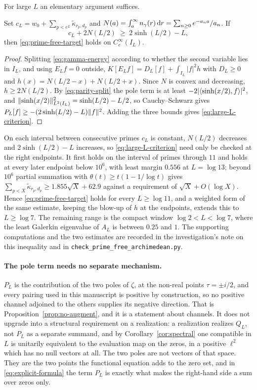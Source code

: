 For large $L$ an elementary argument suffices.

\begin{proposition}\label{prop:prime-free-large-L}
Set $c_L=w_0+\sum_{p<e^L}\widetilde\kappa_{r_p,d_p}$ and
$N(a)=\int_a^\infty n_{\gamma}(r)\,\mathrm d r=\sum_{n\geq0}e^{-a_na}/a_n$. If
\begin{equation}\label{eq:large-L-criterion}
 c_L+2N(L/2)\;\geq\;2\sinh(L/2)-L,
\end{equation}
then \eqref{eq:prime-free-target} holds on $C_c^\infty(I_L)$.
\end{proposition}
\begin{proof}
Splitting \eqref{eq:gamma-energy} according to whether the second variable lies
in $I_L$, and using $E_Lf=0$ outside,
$K[E_Lf]=D_L[f]+\int_{I_L}|f|^2h$ with $D_L\geq0$ and
$h(x)=N(L/2-x)+N(L/2+x)$. Since $N$ is convex and decreasing,
$h\geq2N(L/2)$. By \eqref{eq:parity-split} the pole term is at least
$-2|\langle \sinh(x/2),f\rangle|^2$, and
$\lVert \sinh(x/2)\rVert_{L^2(I_L)}^2=\sinh(L/2)-L/2$, so Cauchy--Schwarz gives
$P_L[f]\geq-(2\sinh(L/2)-L)\lVert f\rVert^2$. Adding the three bounds gives
\eqref{eq:large-L-criterion}.
\end{proof}

On each interval between consecutive primes $c_L$ is constant, $N(L/2)$
decreases and $2\sinh(L/2)-L$ increases, so \eqref{eq:large-L-criterion} need
only be checked at the right endpoints. It first holds on the interval of
primes through $11$ and holds at every later endpoint below $10^6$, with least
margin $0.556$ at $L=\log13$; beyond $10^6$ partial summation with
$\theta(t)\geq t(1-1/\log t)$ gives
$\sum_{p<X}\widetilde\kappa_{r_p,d_p}\geq1.855\sqrt X+62.9$ against a
requirement of $\sqrt X+O(\log X)$. Hence \eqref{eq:prime-free-target} holds
for every $L\geq\log11$, and a weighted form of the same estimate, keeping the
blow-up of $h$ at the endpoints, extends this to $L\geq\log7$. The remaining
range is the compact window $\log2<L<\log7$, where the least Galerkin
eigenvalue of $A_L$ is between $0.25$ and $1$. The supporting computations and
the two estimates are recorded in the investigation's note on this inequality
and in \texttt{check\_prime\_free\_archimedean.py}.

\paragraph{The pole term needs no separate mechanism.}
$P_L$ is the contribution of the two poles of $\zeta$, at the non-real points
$\tau=\pm i/2$, and every pairing used in this manuscript is positive by
construction, so no positive channel adjoined to the others supplies its
negative direction. That is Proposition~\ref{prop:no-augment}, and it is a
statement about channels. It does not upgrade into a structural requirement on
a realization: a realization realizes $Q_L$, not $P_L$ as a separate summand,
and by Corollary~\ref{cor:spectral} one compatible in $L$ is unitarily
equivalent to the evaluation map on the zeros, in a positive $\ell^2$ which has
no null vectors at all. The two poles are not vectors of that space. They are
the two points the functional equation adds to the zero set, and in
\eqref{eq:explicit-formula} the term $P_L$ is exactly what makes the right-hand
side a sum over zeros only.

